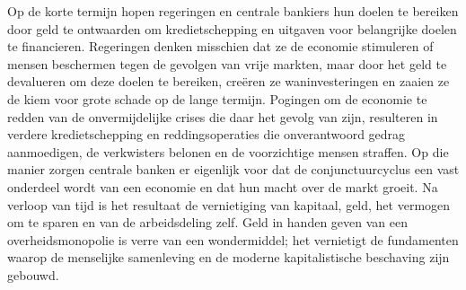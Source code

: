 Op de korte termijn hopen regeringen en centrale bankiers hun doelen te bereiken door geld te ontwaarden om kredietschepping en uitgaven voor belangrijke doelen te financieren. Regeringen denken misschien dat ze de economie stimuleren of mensen beschermen tegen de gevolgen van vrije markten, maar door het geld te devalueren om deze doelen te bereiken, creëren ze waninvesteringen en zaaien ze de kiem voor grote schade op de lange termijn. Pogingen om de economie te redden van de onvermijdelijke crises die daar het gevolg van zijn, resulteren in verdere kredietschepping en reddingsoperaties die onverantwoord gedrag aanmoedigen, de verkwisters belonen en de voorzichtige mensen straffen. Op die manier zorgen centrale banken er eigenlijk voor dat de conjunctuurcyclus een vast onderdeel wordt van een economie en dat hun macht over de markt groeit. Na verloop van tijd is het resultaat de vernietiging van kapitaal, geld, het vermogen om te sparen en van de arbeidsdeling zelf. Geld in handen geven van een overheidsmonopolie is verre van een wondermiddel; het vernietigt de fundamenten waarop de menselijke samenleving en de moderne kapitalistische beschaving zijn gebouwd.
